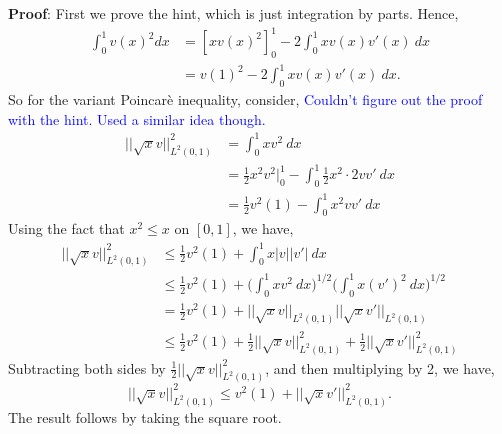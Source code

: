 \documentclass[11pt]{article}
\begin{document}
\vskip 1cm

{\bf Proof}: First we prove the hint, which is just integration by parts.
Hence,
\begin{align*}
    \int_0^1 v(x)^2 dx &= [xv(x)^2]_0^1 - 2\int_0^1 xv(x)v'(x) \: dx \\
    &= v(1)^2 - 2\int_0^1 xv(x)v'(x) \: dx.
\end{align*}
So for the variant Poincar\`{e} inequality, consider,
\textcolor{blue}{Couldn't figure out the proof with the hint. Used a similar idea though.}
\begin{align*}
    ||\sqrt{x}v||_{L^2(0,1)}^2 &= \int_0^1 x v^2 \: dx \\
    &= \frac{1}{2}x^2 v^2\big|_0^1 - \int_0^1 \frac{1}{2} x^2 \cdot 2 v v' \: dx \\
    &= \frac{1}{2} v^2(1) - \int_0^1 x^2 v v' \: dx 
\end{align*}
Using the fact that $x^2 \leq x$ on $[0,1]$, we have,
\begin{align*}
    ||\sqrt{x} v||^2_{L^2(0,1)} &\leq \frac{1}{2} v^2(1) + \int_0^1 x |v| |v'| \: dx \\
    &\leq  \frac{1}{2} v^2(1) + \Big(\int_0^1 x v^2 \: dx \Big)^{1/2} \Big( \int_0^1 x (v')^2 \: dx \Big)^{1/2} \\
    &= \frac{1}{2} v^2(1) + ||\sqrt{x} v||_{L^2(0,1)} ||\sqrt{x} v'||_{L^2(0,1)} \\
    &\leq \frac{1}{2}v^2(1) + \frac{1}{2} ||\sqrt{x} v||^2_{L^2(0,1)} + \frac{1}{2} ||\sqrt{x} v'||^2_{L^2(0,1)} 
\end{align*}
Subtracting both sides by $\frac{1}{2} ||\sqrt{x}v||_{L^2(0,1)}^2$, and then multiplying by 2, we have,
\begin{equation*}
    ||\sqrt{x}v||_{L^2(0,1)}^2 \leq v^2(1) + ||\sqrt{x} v'||^2_{L^2(0,1)}.
\end{equation*}
The result follows by taking the square root.
\end{document}
